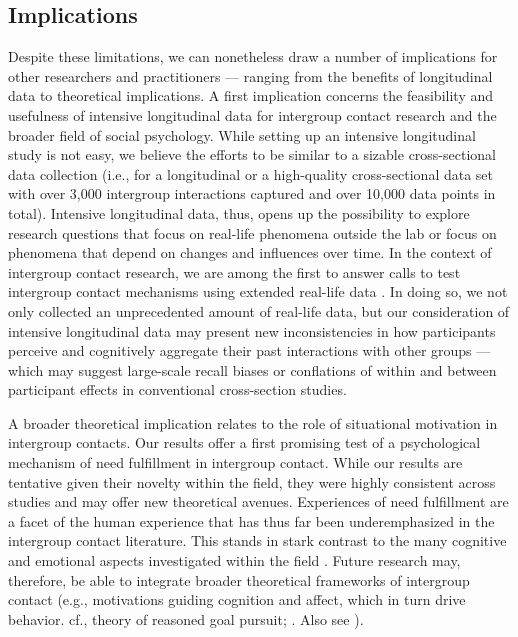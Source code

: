 \documentclass[man, 12pt, a4paper, mask]{apa7}
\theoremstyle{break}
\theoremstyle{plain}
\begin{document}
\subsection{Implications}
Despite these limitations, we can nonetheless draw a number of implications for other researchers and practitioners --- ranging from the benefits of longitudinal data to theoretical implications. A first implication concerns the feasibility and usefulness of intensive longitudinal data for intergroup contact research and the broader field of social psychology. While setting up an intensive longitudinal study is not easy, we believe the efforts to be similar to a sizable cross-sectional data collection (i.e., for a longitudinal or a high-quality cross-sectional data set with over 3,000 intergroup interactions captured and over 10,000 data points in total). Intensive longitudinal data, thus, opens up the possibility to explore research questions that focus on real-life phenomena outside the lab or focus on phenomena that depend on changes and influences over time. In the context of intergroup contact research, we are among the first to answer calls to test intergroup contact mechanisms using extended real-life data \citep[e.g.,][]{Pettigrew2011, MacInnis2015}. In doing so, we not only collected an unprecedented amount of real-life data, but our consideration of intensive longitudinal data may present new inconsistencies in how participants perceive and cognitively aggregate their past interactions with other groups — which may suggest large-scale recall biases or conflations of within and between participant effects in conventional cross-section studies.

A broader theoretical implication relates to the role of situational motivation in intergroup contacts. Our results offer a first promising test of a psychological mechanism of need fulfillment in intergroup contact. While our results are tentative given their novelty within the field, they were highly consistent across studies and may offer new theoretical avenues. Experiences of need fulfillment are a facet of the human experience that has thus far been underemphasized in the intergroup contact literature. This stands in stark contrast to the many cognitive \citep[e.g.,][]{Pettigrew1998, Brown2005} and emotional aspects investigated within the field \citep[e.g.,][]{Stephan2008}. Future research may, therefore, be able to integrate broader theoretical frameworks of intergroup contact (e.g., motivations guiding cognition and affect, which in turn drive behavior. cf., theory of reasoned goal pursuit; \citealp{Ajzen2019}. Also see \citealp{Kreienkamp2022d}). 
\end{document}
